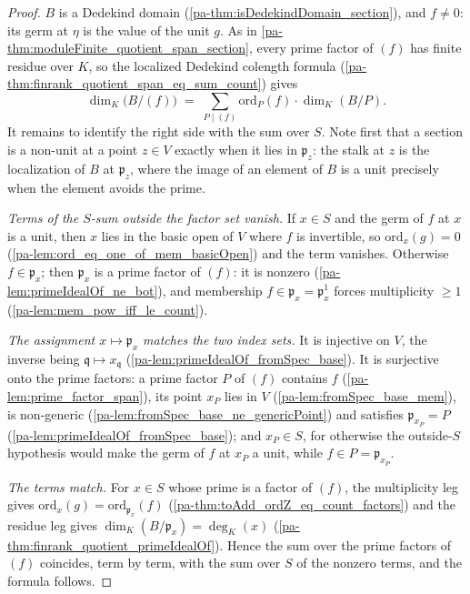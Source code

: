 \begin{proof}
  \leanok
  \(B\) is a Dedekind domain (\ref{pa-thm:isDedekindDomain_section}), and \(f \neq 0\):
  its germ at \(\eta\) is the value of the unit \(g\). As in
  \ref{pa-thm:moduleFinite_quotient_span_section}, every prime factor of \((f)\) has
  finite residue over \(K\), so the localized Dedekind colength formula
  (\ref{pa-thm:finrank_quotient_span_eq_sum_count}) gives
  \[
    \dim_K\bigl(B/(f)\bigr) \;=\;
      \sum_{P \mid (f)} \mathrm{ord}_P(f) \cdot \dim_K(B/P) .
  \]
  It remains to identify the right side with the sum over \(S\). Note first that a
  section is a non-unit at a point \(z \in V\) exactly when it lies in
  \(\mathfrak p_z\): the stalk at \(z\) is the localization of \(B\) at
  \(\mathfrak p_z\), where the image of an element of \(B\) is a unit precisely when
  the element avoids the prime.

  \emph{Terms of the \(S\)-sum outside the factor set vanish.} If \(x \in S\) and the
  germ of \(f\) at \(x\) is a unit, then \(x\) lies in the basic open of \(V\) where
  \(f\) is invertible, so \(\mathrm{ord}_x(g) = 0\)
  (\ref{pa-lem:ord_eq_one_of_mem_basicOpen}) and the term vanishes. Otherwise
  \(f \in \mathfrak p_x\); then \(\mathfrak p_x\) is a prime factor of \((f)\): it is
  nonzero (\ref{pa-lem:primeIdealOf_ne_bot}), and membership \(f \in \mathfrak p_x =
  \mathfrak p_x^1\) forces multiplicity \(\ge 1\)
  (\ref{pa-lem:mem_pow_iff_le_count}).

  \emph{The assignment \(x \mapsto \mathfrak p_x\) matches the two index sets.} It is
  injective on \(V\), the inverse being \(\mathfrak q \mapsto x_{\mathfrak q}\)
  (\ref{pa-lem:primeIdealOf_fromSpec_base}). It is surjective onto the prime factors:
  a prime factor \(P\) of \((f)\) contains \(f\) (\ref{pa-lem:prime_factor_span}), its
  point \(x_P\) lies in \(V\) (\ref{pa-lem:fromSpec_base_mem}), is non-generic
  (\ref{pa-lem:fromSpec_base_ne_genericPoint}) and satisfies \(\mathfrak p_{x_P} = P\)
  (\ref{pa-lem:primeIdealOf_fromSpec_base}); and \(x_P \in S\), for otherwise the
  outside-\(S\) hypothesis would make the germ of \(f\) at \(x_P\) a unit, while
  \(f \in P = \mathfrak p_{x_P}\).

  \emph{The terms match.} For \(x \in S\) whose prime is a factor of \((f)\), the
  multiplicity leg gives \(\mathrm{ord}_x(g) = \mathrm{ord}_{\mathfrak p_x}(f)\)
  (\ref{pa-thm:toAdd_ordZ_eq_count_factors}) and the residue leg gives
  \(\dim_K(B/\mathfrak p_x) = \deg_K(x)\)
  (\ref{pa-thm:finrank_quotient_primeIdealOf}). Hence the sum over the prime factors of
  \((f)\) coincides, term by term, with the sum over \(S\) of the nonzero terms, and
  the formula follows.
\end{proof}

